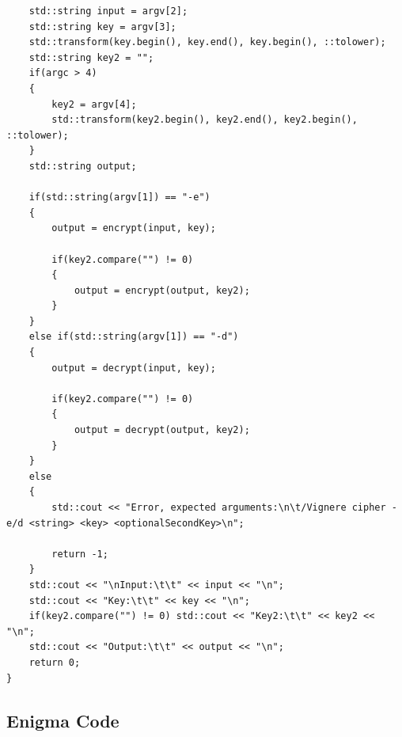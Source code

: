 \documentclass{article}
\begin{document}
\begin{lstlisting}
	std::string input = argv[2];
	std::string key = argv[3];
	std::transform(key.begin(), key.end(), key.begin(), ::tolower);
	std::string key2 = "";
	if(argc > 4)
	{	
		key2 = argv[4];
		std::transform(key2.begin(), key2.end(), key2.begin(), ::tolower);
	}
	std::string output;

	if(std::string(argv[1]) == "-e")
	{
		output = encrypt(input, key);

		if(key2.compare("") != 0)
		{
			output = encrypt(output, key2); 
		}
	}
	else if(std::string(argv[1]) == "-d")
	{
		output = decrypt(input, key);

		if(key2.compare("") != 0)
		{
			output = decrypt(output, key2);
		}
	}
	else
	{
		std::cout << "Error, expected arguments:\n\t/Vignere cipher -e/d <string> <key> <optionalSecondKey>\n";

		return -1;
	}
	std::cout << "\nInput:\t\t" << input << "\n";
	std::cout << "Key:\t\t" << key << "\n";
	if(key2.compare("") != 0) std::cout << "Key2:\t\t" << key2 << "\n";
	std::cout << "Output:\t\t" << output << "\n"; 
	return 0;
}
\end{lstlisting}

\subsection{Enigma Code}
\end{document}

